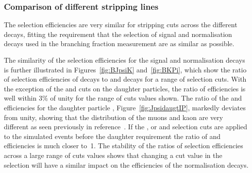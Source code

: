 \subsubsection*{Comparison of different stripping lines}

The selection efficiencies are very similar for stripping cuts across the different decays, fitting the requirement that the selection of signal and normalisation decays used in the branching fraction measurement are as similar as possible. 

The similarity of the selection efficiencies for the signal and normalisation decays is further illustrated in Figures~\ref{fig:BJpsiK} and~\ref{fig:BKPi}, which show the ratio of selection efficiencies of \bsmumu decays to \bujpsik and \bdkpi decays for a range of selection cuts. With the exception of the \bsmumu and \bujpsik \chiIP cuts on the daughter particles, the ratio of efficiencies is well within $3\%$ of unity for the range of cuts values shown. The ratio of the \bsmumu and \bujpsik efficiencies for the daughter particle \chiIP, Figure~\ref{fig:JpsidaugtIP}, markedly deviates from unity, showing that the \chiIP distribution of the muons and kaon are very different as seen previously in reference~\cite{Diego}. If the \chiFD, \bs or \jpsi \chiIP and \chivtx selection cuts are applied to the simulated events before the daughter \chiIP requirement the ratio of \bsmumu and \bujpsik efficiencies is much closer to~1. The stability of the ratios of selection efficiencies across a large range of cuts values shows that changing a cut value in the \bmumu selection will have a similar impact on the efficiencies of the normalisation decays. 

